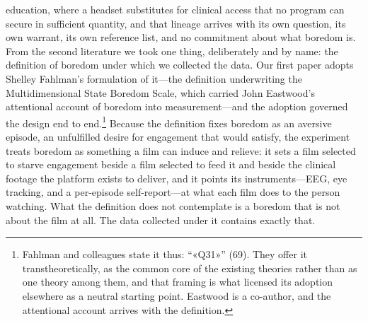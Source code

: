education, where a headset substitutes for clinical access that no program can secure in
sufficient quantity, and that lineage arrives with its own question, its own warrant, its own
reference list, and no commitment about what boredom is. From the second literature we took
one thing, deliberately and by name: the definition of boredom under which we collected the
data. Our first paper adopts Shelley Fahlman's formulation of it---the definition
underwriting the Multidimensional State Boredom Scale, which carried John Eastwood's
attentional account of boredom into measurement---and the adoption governed the design end to
end.\footnote{Fahlman and colleagues state it thus: ``«Q31»'' (69). They offer it
transtheoretically, as the common core of the existing theories rather than as one theory
among them, and that framing is what licensed its adoption elsewhere as a neutral starting
point. Eastwood is a co-author, and the attentional account arrives with the definition.} Because the definition fixes boredom as an aversive episode, an unfulfilled desire for
engagement that would satisfy, the experiment treats boredom as something a film can induce
and relieve: it sets a film selected to starve engagement beside a film selected to feed it
and beside the clinical footage the platform exists to deliver, and it points its
instruments---EEG, eye tracking, and a per-episode self-report---at what each film does to
the person watching. What the definition does not contemplate is a boredom that is not about
the film at all. The data collected under it contains exactly that.


